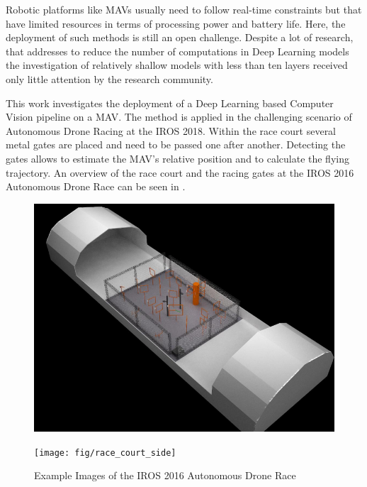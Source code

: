 Robotic platforms like \acp{MAV} usually need to follow real-time constraints but that have limited resources in terms of processing power and battery life. Here, the deployment of such methods is still an open challenge. Despite a lot of research, that addresses to reduce the number of computations in Deep Learning models \cite{YoungwanLee, Zagoruyko2016, Howard2017, Ghosh2017, Sandler2018, Zhang2017a} the investigation of relatively shallow models with less than ten layers received only little attention by the research community.

This work investigates the deployment of a Deep Learning based Computer Vision pipeline on a \ac{MAV}. The method is applied in the challenging scenario of Autonomous Drone Racing at the \ac{IROS} 2018. Within the race court several metal gates are placed and need to be passed one after another. Detecting the gates allows to estimate the \ac{MAV}'s relative position and to calculate the flying trajectory. An overview of the race court and the racing gates at the \ac{IROS} 2016 Autonomous Drone Race can be seen in .

\begin{figure}[bhtp]
	\centering
	\begin{minipage}{0.45\linewidth}
	\includegraphics[width=\textwidth]{fig/race_court}
	\end{minipage}\hfill
\begin{minipage}{0.45\linewidth}
	\texttt{[image: fig/race\_court\_side]}
\end{minipage}
\caption{Example Images of the \ac{IROS} 2016 Autonomous Drone Race}
\label{fig:race_court}
\end{figure}

